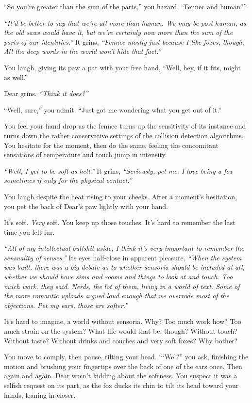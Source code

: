 ``So you're greater than the sum of the parts,'' you hazard. ``Fennec and human?''

\emph{``It'd be better to say that we're all more than human. We may be post-human, as the old saws would have it, but we're certainly now more than the sum of the parts of our identities.''} It grins, \emph{``Fennec mostly just because I like foxes, though. All the deep words in the world won't hide that fact.''}

You laugh, giving its paw a pat with your free hand, ``Well, hey, if it fits, might as well.''

Dear grins. \emph{``Think it does?''}

``Well, sure,'' you admit. ``Just got me wondering what you get out of it.''

You feel your hand drop as the fennec turns up the sensitivity of its instance and turns down the rather conservative settings of the collision detection algorithms. You hesitate for the moment, then do the same, feeling the concomitant sensations of temperature and touch jump in intensity.

\emph{``Well, I get to be soft as hell.''} It grins, \emph{``Seriously, pet me. I love being a fox sometimes if only for the physical contact.''}

You laugh despite the heat rising to your cheeks. After a moment's hesitation, you pet the back of Dear's paw lightly with your hand.

It's soft. \emph{Very} soft. You keep up those touches. It's hard to remember the last time you felt fur.

\emph{``All of my intellectual bullshit aside, I think it's very important to remember the sensuality of senses.''} Its eyes half-close in apparent pleasure. \emph{``When the system was built, there was a big debate as to whether sensoria should be included at all, whether we should have sims and rooms and things to look at and touch. Too much work, they said. Nerds, the lot of them, living in a world of text. Some of the more romantic uploads argued loud enough that we overrode most of the objections. Pet my ears, those are softer.''}

It's hard to imagine, a world without sensoria. Why? Too much work how? Too much strain on the system? What life would that be, though? Without touch? Without taste? Without drinks and couches and very soft foxes? Why bother?

You move to comply, then pause, tilting your head. ```We'?'' you ask, finishing the motion and brushing your fingertips over the back of one of the ears once. Then again and again. Dear wasn't kidding about the softness. You suspect it was a selfish request on its part, as the fox ducks its chin to tilt its head toward your hands, leaning in closer.

